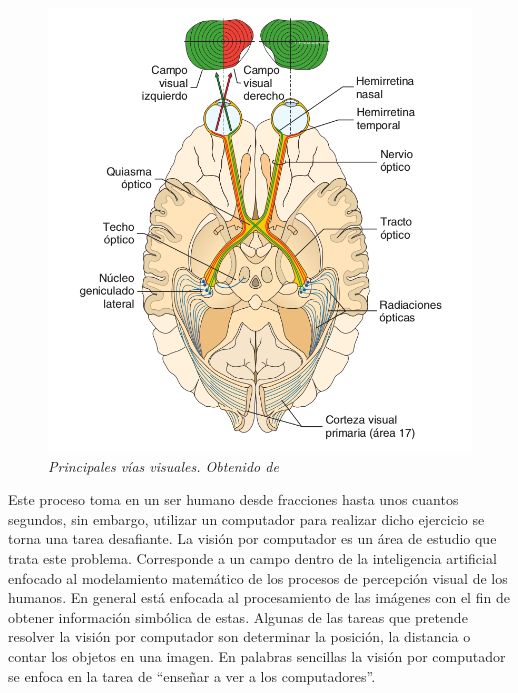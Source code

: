 \begin{figure}[htc]
  \centering
  \includegraphics[scale=.3]{images/cerebro}
  \caption{\em Principales vías visuales. Obtenido de \cite{Battaglini2010}}  
  \label{fig:cerebro}
\end{figure}

Este proceso toma en un ser humano desde fracciones hasta unos cuantos segundos, sin embargo, utilizar un computador para realizar dicho ejercicio se torna una tarea desafiante. La visión por computador es un área de estudio que trata este problema. Corresponde a un campo dentro de la inteligencia artificial enfocado al modelamiento matemático de los procesos de percepción visual de los humanos. En general está enfocada al procesamiento de las imágenes con el fin de obtener información simbólica de estas. Algunas de las tareas que pretende resolver la visión por computador son determinar la posición, la distancia o contar los objetos en una imagen. En palabras sencillas la visión por computador se enfoca en la tarea de ``enseñar a ver a los computadores''.

